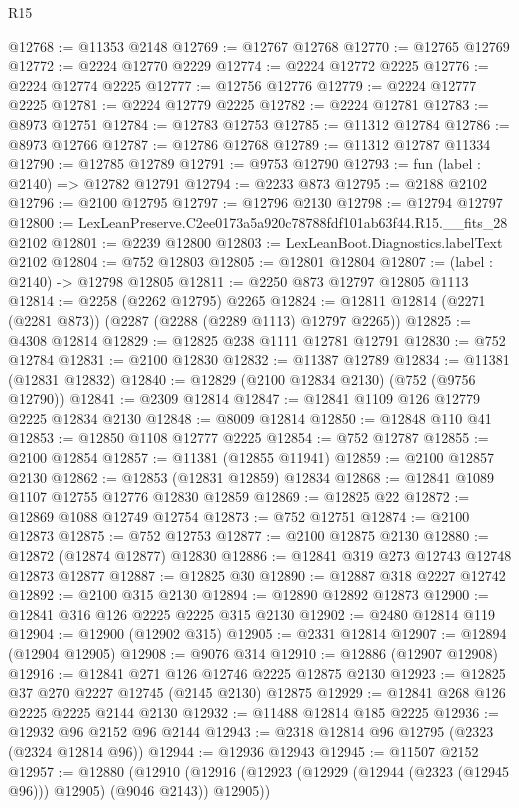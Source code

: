 \begin{lexlean}{R15}
\begin{coremodule}
@12768 := @11353 @2148
@12769 := @12767 @12768
@12770 := @12765 @12769
@12772 := @2224 @12770 @2229
@12774 := @2224 @12772 @2225
@12776 := @2224 @12774 @2225
@12777 := @12756 @12776
@12779 := @2224 @12777 @2225
@12781 := @2224 @12779 @2225
@12782 := @2224 @12781
@12783 := @8973 @12751
@12784 := @12783 @12753
@12785 := @11312 @12784
@12786 := @8973 @12766
@12787 := @12786 @12768
@12789 := @11312 @12787 @11334
@12790 := @12785 @12789
@12791 := @9753 @12790
@12793 := fun (label : @2140) => @12782 @12791
@12794 := @2233 @873
@12795 := @2188 @2102
@12796 := @2100 @12795
@12797 := @12796 @2130
@12798 := @12794 @12797
@12800 := LexLeanPreserve.C2ee0173a5a920c78788fdf101ab63f44.R15.__fits_28 @2102
@12801 := @2239 @12800
@12803 := LexLeanBoot.Diagnostics.labelText @2102
@12804 := @752 @12803
@12805 := @12801 @12804
@12807 := (label : @2140) -> @12798 @12805
@12811 := @2250 @873 @12797 @12805 @1113
@12814 := @2258 (@2262 @12795) @2265
@12824 := @12811 @12814 (@2271 (@2281 @873)) (@2287 (@2288 (@2289 @1113) @12797 @2265))
@12825 := @4308 @12814
@12829 := @12825 @238 @1111 @12781 @12791
@12830 := @752 @12784
@12831 := @2100 @12830
@12832 := @11387 @12789
@12834 := @11381 (@12831 @12832)
@12840 := @12829 (@2100 @12834 @2130) (@752 (@9756 @12790))
@12841 := @2309 @12814
@12847 := @12841 @1109 @126 @12779 @2225 @12834 @2130
@12848 := @8009 @12814
@12850 := @12848 @110 @41
@12853 := @12850 @1108 @12777 @2225
@12854 := @752 @12787
@12855 := @2100 @12854
@12857 := @11381 (@12855 @11941)
@12859 := @2100 @12857 @2130
@12862 := @12853 (@12831 @12859) @12834
@12868 := @12841 @1089 @1107 @12755 @12776 @12830 @12859
@12869 := @12825 @22
@12872 := @12869 @1088 @12749 @12754
@12873 := @752 @12751
@12874 := @2100 @12873
@12875 := @752 @12753
@12877 := @2100 @12875 @2130
@12880 := @12872 (@12874 @12877) @12830
@12886 := @12841 @319 @273 @12743 @12748 @12873 @12877
@12887 := @12825 @30
@12890 := @12887 @318 @2227 @12742
@12892 := @2100 @315 @2130
@12894 := @12890 @12892 @12873
@12900 := @12841 @316 @126 @2225 @2225 @315 @2130
@12902 := @2480 @12814 @119
@12904 := @12900 (@12902 @315)
@12905 := @2331 @12814
@12907 := @12894 (@12904 @12905)
@12908 := @9076 @314
@12910 := @12886 (@12907 @12908)
@12916 := @12841 @271 @126 @12746 @2225 @12875 @2130
@12923 := @12825 @37 @270 @2227 @12745 (@2145 @2130) @12875
@12929 := @12841 @268 @126 @2225 @2225 @2144 @2130
@12932 := @11488 @12814 @185 @2225
@12936 := @12932 @96 @2152 @96 @2144
@12943 := @2318 @12814 @96 @12795 (@2323 (@2324 @12814 @96))
@12944 := @12936 @12943
@12945 := @11507 @2152
@12957 := @12880
    (@12910 (@12916 (@12923 (@12929 (@12944 (@2323 (@12945 @96))) @12905) (@9046 @2143)) @12905))

\end{coremodule}
\end{lexlean}
